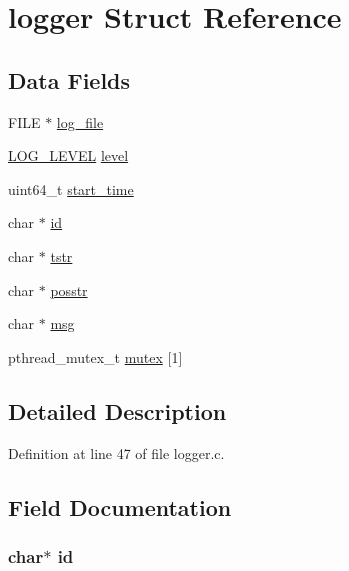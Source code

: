 \hypertarget{structlogger}{\section{logger Struct Reference}
\label{structlogger}
}
\subsection*{Data Fields}
\begin{DoxyCompactItemize}
\item 
F\+I\+L\+E $\ast$ \hyperlink{structlogger_ab936051f5aaca44c6c3c41dee0d19c36}{log\+\_\+file}
\item 
\hyperlink{logger_8h_aa5a9053636a30269210c54e734e0d583}{L\+O\+G\+\_\+\+L\+E\+V\+E\+L} \hyperlink{structlogger_a77f7159081bd39a76d8b86af56256201}{level}
\item 
uint64\+\_\+t \hyperlink{structlogger_a5b11efea935978e9f1913e964a5e5396}{start\+\_\+time}
\item 
char $\ast$ \hyperlink{structlogger_aecb3b0d045ada529257a2fbf8f829599}{id}
\item 
char $\ast$ \hyperlink{structlogger_a756188d61db4922010ba1bf67c2f381e}{tstr}
\item 
char $\ast$ \hyperlink{structlogger_a56126aabcbc86b3b9b826e08036685eb}{posstr}
\item 
char $\ast$ \hyperlink{structlogger_a32d2f5216cddb59c7cc8fb2806a7e727}{msg}
\item 
pthread\+\_\+mutex\+\_\+t \hyperlink{structlogger_ab4293016252c4d4e63549b0773fa0f33}{mutex} \mbox{[}1\mbox{]}
\end{DoxyCompactItemize}


\subsection{Detailed Description}


Definition at line 47 of file logger.\+c.



\subsection{Field Documentation}
\hypertarget{structlogger_aecb3b0d045ada529257a2fbf8f829599}{
\subsubsection[{id}]{\setlength{\rightskip}{0pt plus 5cm}char$\ast$ id}}\label{structlogger_aecb3b0d045ada529257a2fbf8f829599}


